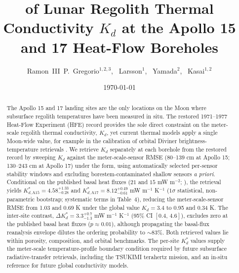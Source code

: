 \documentclass[11pt]{article}
\title{\bfseries \old{Estimates} \new{Difference} of Lunar Regolith Thermal Conductivity $K_d$ at the Apollo 15 and 17 Heat-Flow Boreholes}
\author{%
  Ramon~III~P.~Gregorio$^{1,2,3}$,\quad
  \new{Richard}~Larsson$^{1}$,\quad
  \new{Takayoshi}~Yamada$^{2}$,\quad
  \new{Yasuko}~Kasai$^{1,2}$%
}
\date{\today}
\begin{document}
\linenumbers
\maketitle



\begin{abstract}
\noindent
The Apollo 15 and 17 landing sites are the only locations on the Moon
where subsurface regolith temperatures have been measured in situ. The
restored 1971--1977 Heat-Flow Experiment (HFE) record provides the sole
direct constraint on the meter-scale regolith thermal conductivity,
$K_d$, yet current thermal models apply a single Moon-wide value, for
example in the calibration of orbital Diviner brightness-temperature
retrievals \citep{hayne2017,martinez2021}. We retrieve $K_d$ separately
at each borehole from the restored record \citep{nagihara2018} by
sweeping $K_d$ against the meter-scale-sensor RMSE (80--139 cm at
Apollo 15; 130--243 cm at Apollo 17) under the \citet{hayne2017} form,
using automatically selected per-sensor stability windows and excluding
borestem-contaminated shallow sensors \emph{a priori}. Conditional on
the published basal heat fluxes ($21$ and $15$ mW m$^{-2}$;
\citealp{langseth1976}), the retrieval yields
$K_{d,\mathrm{A15}}^{*}=4.58^{+1.33}_{-0.28}$ and
$K_{d,\mathrm{A17}}^{*}=8.12^{+0.49}_{-0.61}$ mW m$^{-1}$ K$^{-1}$
($1\sigma$ statistical, non-parametric bootstrap; systematic terms in
Table~4), reducing the meter-scale-sensor
RMSE from 1.03 and 0.69 K under the global value $K_d=3.4$ to 0.95 and
0.34 K. The inter-site contrast,
$\Delta K_d^{*}=3.3^{+0.7}_{-1.3}$ mW m$^{-1}$ K$^{-1}$ (95\% CI
$[0.4,\,4.6]$), excludes zero at the published basal heat fluxes
($p\approx 0.01$), although propagating the basal-flux reanalysis
envelope dilutes the ordering probability to $\sim$83\%. Both retrieved
values lie within porosity, composition, and orbital benchmarks. The
per-site $K_d^{*}$ values supply the meter-scale temperature-profile
boundary condition required by future subsurface radiative-transfer
retrievals, including the TSUKIMI terahertz mission, and an in-situ
reference for future global conductivity models.
\end{abstract}
\end{document}
